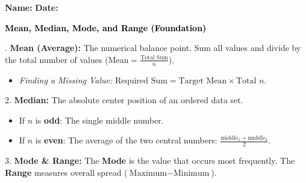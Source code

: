 \documentclass[12pt, letterpaper, fleqn]{article}
\begin{document}
\textbf{Name:} \underline{\hspace{5cm}}
\hfill
\textbf{Date:} \underline{\hspace{3cm}}\\

\begin{tcolorbox}[colback=black!10]
    \large\textcolor{black}{\textbf{Mean, Median, Mode, and Range (Foundation)}}
\end{tcolorbox}

\vspace{2mm}

. \textbf{Mean (Average):} The numerical balance point. Sum all values and divide by the total number of values ($\text{Mean} = \frac{\text{Total Sum}}{n}$). 
   \begin{itemize}[noitemsep, leftmargin=0.5cm]
       \item \textit{Finding a Missing Value:} $\text{Required Sum} = \text{Target Mean} \times \text{Total } n$.
   \end{itemize}
2. \textbf{Median:} The absolute center position of an ordered data set.
   \begin{itemize}[noitemsep, leftmargin=0.5cm]
       \item If $n$ is \textbf{odd}: The single middle number.
       \item If $n$ is \textbf{even}: The average of the two central numbers: $\frac{\text{middle}_1 + \text{middle}_2}{2}$.
   \end{itemize}
3. \textbf{Mode \& Range:} The \textbf{Mode} is the value that occurs most frequently. The \textbf{Range} measures overall spread ($\text{Maximum} - \text{Minimum}$).

\vspace{3mm}
\vspace{1cm}
\begin{center}
\end{center}
\end{document}
